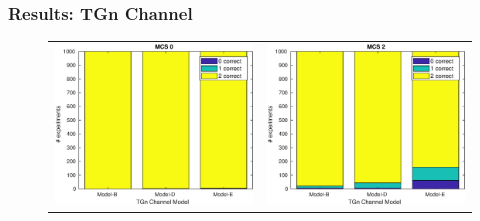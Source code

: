 \documentclass[accentcolor=tud8b,colorbacktitle]{tudbeamer}
\begin{document}
\begin{frame}
\frametitle{Results: TGn Channel}
\begin{figure}[H]
	\centering
	\vspace{-0.5cm}
	\begin{tabular}{cc}
		\includegraphics[height=0.52\textheight]{../../gfx/plots/tgn-mcs0} &
		\includegraphics[height=0.52\textheight]{../../gfx/plots/tgn-mcs2} \\

\end{tabular}
\end{figure}
\end{frame}
\end{document}
